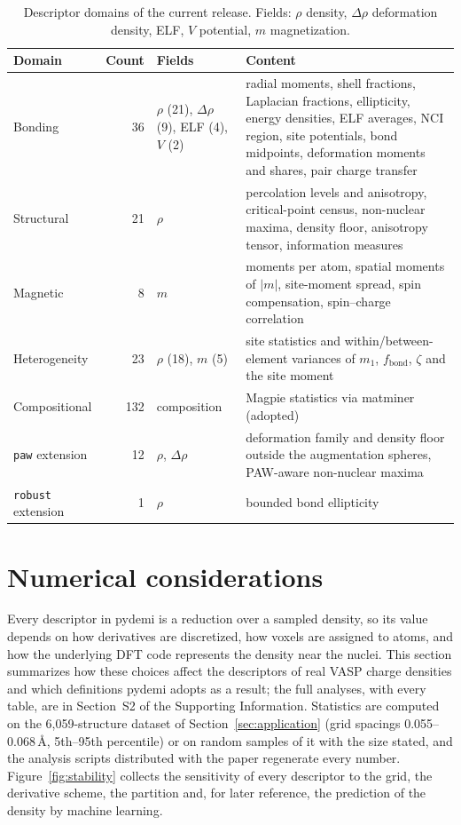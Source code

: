 \documentclass[11pt,a4paper]{article}
\begin{document}
\begin{table}[htbp]
\centering
\caption{Descriptor domains of the current release. Fields: $\rho$ density,
$\Delta\rho$ deformation density, ELF, $V$ potential, $m$ magnetization.}
\label{tab:families}
\small
\begin{tabular}{p{2.3cm}rp{2.2cm}p{9cm}}
\toprule
Domain & Count & Fields & Content \\
\midrule
Bonding & 36 & $\rho$ (21), $\Delta\rho$ (9), ELF (4), $V$ (2) & radial moments, shell fractions, Laplacian fractions, ellipticity, energy densities, ELF averages, NCI region, site potentials, bond midpoints, deformation moments and shares, pair charge transfer \\
Structural & 21 & $\rho$ & percolation levels and anisotropy, critical-point census, non-nuclear maxima, density floor, anisotropy tensor, information measures \\
Magnetic & 8 & $m$ & moments per atom, spatial moments of $|m|$, site-moment spread, spin compensation, spin--charge correlation \\
Heterogeneity & 23 & $\rho$ (18), $m$ (5) & site statistics and within/between-element variances of $m_1$, $f_{\mathrm{bond}}$, $\zeta$ and the site moment \\
Compositional & 132 & composition & Magpie statistics via matminer (adopted) \\
\midrule
\texttt{paw} extension & 12 & $\rho$, $\Delta\rho$ & deformation family and density floor outside the augmentation spheres, PAW-aware non-nuclear maxima \\
\texttt{robust} extension & 1 & $\rho$ & bounded bond ellipticity \\
\bottomrule
\end{tabular}
\end{table}

\section{Numerical considerations}
\label{sec:numerics}

Every descriptor in pydemi is a reduction over a sampled density, so its value
depends on how derivatives are discretized, how voxels are assigned to atoms,
and how the underlying DFT code represents the density near the nuclei. This
section summarizes how these choices affect the descriptors of real VASP
charge densities and which definitions pydemi adopts as a result; the full
analyses, with every table, are in Section~S2 of the Supporting Information.
Statistics are computed on the 6,059-structure dataset of
Section~\ref{sec:application} (grid spacings 0.055--0.068\,\AA, 5th--95th
percentile) or on random samples of it with the size stated, and the analysis
scripts distributed with the paper regenerate every number.
Figure~\ref{fig:stability} collects the sensitivity of every descriptor to the
grid, the derivative scheme, the partition and, for later reference, the
prediction of the density by machine learning.
\end{document}
